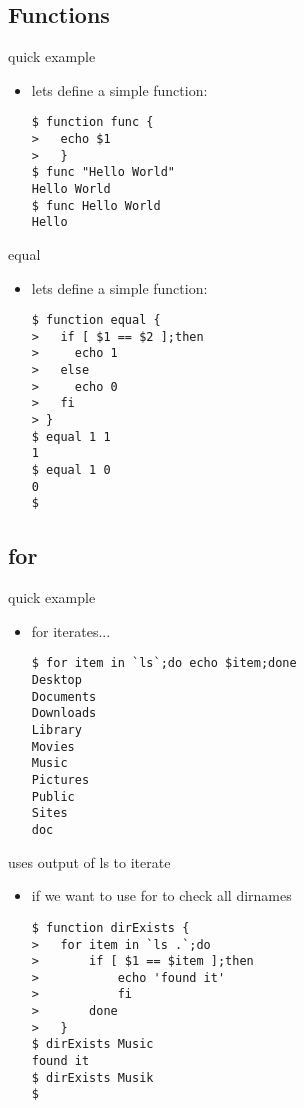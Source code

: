 \documentclass[hyperref={pdfpagelabels=false}]{beamer}
\begin{document}
    \subsection{Functions}
        \begin{frame}[fragile]{quick example}
			\begin{itemize}
                \item<1-> lets define a simple function:
                    \begin{verbatim}
$ function func { 
>   echo $1
>   }
$ func "Hello World"
Hello World
$ func Hello World
Hello
\end{verbatim}
            \end{itemize}
		\end{frame}
        \begin{frame}[fragile]{equal}
			\begin{itemize}
                \item<1-> lets define a simple function:
                    \begin{verbatim}
$ function equal {
>   if [ $1 == $2 ];then
>     echo 1
>   else
>     echo 0
>   fi
> }
$ equal 1 1
1
$ equal 1 0
0
$ 
\end{verbatim}
            \end{itemize}
		\end{frame}
    \subsection{for}
        \begin{frame}[fragile]{quick example}
			\begin{itemize}
                \item<1-> for iterates...
                    \begin{verbatim}
$ for item in `ls`;do echo $item;done 
Desktop
Documents
Downloads
Library
Movies
Music
Pictures
Public
Sites
doc\end{verbatim}
            \end{itemize}
		\end{frame}
        \begin{frame}[fragile]{uses output of ls to iterate}
			\begin{itemize}
                \item<1-> if we want to use for to check all dirnames
                    \begin{verbatim}
$ function dirExists {
>   for item in `ls .`;do
>       if [ $1 == $item ];then
>           echo 'found it'
>           fi
>       done
>   }
$ dirExists Music
found it
$ dirExists Musik
$  
\end{verbatim}
            \end{itemize}
		\end{frame}
                
\end{document}
